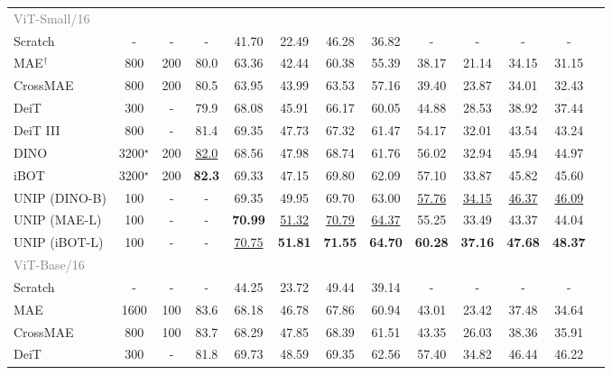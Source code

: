 \begin{table}[t]
{{\begin{tabular}{l c c c c  c c c c c c c c}
         \midrule
         \textcolor{gray}{ViT-Small/16} & & & & & & & & & & & \\
         Scratch & - & - & - & 41.70 & 22.49 & 46.28 & 36.82 & - & - & - & - \\
         \rowcolor{gray!15} MAE$^\dag$ \citep{mae} & 800 & 200 & 80.0 & 63.36 & 42.44 & 60.38 & 55.39 & 38.17 & 21.14 & 34.15 & 31.15 \\
         \rowcolor{gray!15} CrossMAE \citep{crossmae} & 800 & 200 & 80.5 & 63.95 & 43.99 & 63.53 & 57.16 & 39.40 & 23.87 & 34.01 & 32.43 \\
         \rowcolor{orange!15} DeiT \citep{deit} & 300 & - & 79.9 & 68.08 & 45.91 & 66.17 & 60.05 & 44.88 & 28.53 & 38.92 & 37.44 \\
         \rowcolor{orange!15} DeiT III \citep{deit3} & 800 & - & 81.4 & 69.35 & 47.73 & 67.32 & 61.47 & 54.17 & 32.01 & 43.54 & 43.24 \\
         \rowcolor{orange!15} DINO \citep{dino} & 3200$^\star$ & 200 & \underline{82.0} & 68.56 & 47.98 & 68.74 & 61.76 & 56.02 & 32.94 & 45.94 & 44.97 \\
         \rowcolor{orange!15} iBOT \citep{iBOT} & 3200$^\star$ & 200 & \textbf{82.3} & 69.33 & 47.15 & 69.80 & 62.09 & 57.10 & 33.87 & 45.82 & 45.60 \\
         \rowcolor{cyan!15} UNIP (DINO-B) & 100 & - & - & 69.35 & 49.95 & 69.70 & 63.00 & \underline{57.76} & \underline{34.15} & \underline{46.37} & \underline{46.09} \\
         \rowcolor{cyan!15} UNIP (MAE-L) & 100 & - & - & \textbf{70.99} & \underline{51.32} & \underline{70.79} & \underline{64.37} & 55.25 & 33.49 & 43.37 & 44.04 \\
         \rowcolor{cyan!15} UNIP (iBOT-L) & 100 & - & - & \underline{70.75} & \textbf{51.81} & \textbf{71.55} & \textbf{64.70} & \textbf{60.28} & \textbf{37.16} & \textbf{47.68} & \textbf{48.37} \\ 
        \midrule
        \textcolor{gray}{ViT-Base/16} & & & & & & & & & & & \\
        Scratch & - & - & - & 44.25 & 23.72 & 49.44 & 39.14 & - & - & - & - \\
        \rowcolor{gray!15} MAE \citep{mae} & 1600 & 100 & 83.6 & 68.18 & 46.78 & 67.86 & 60.94 & 43.01 & 23.42 & 37.48 & 34.64 \\
        \rowcolor{gray!15} CrossMAE \citep{crossmae} & 800 & 100 & 83.7 & 68.29 & 47.85 & 68.39 & 61.51 & 43.35 & 26.03 & 38.36 & 35.91 \\
        \rowcolor{orange!15} DeiT \citep{deit} & 300 & - & 81.8 & 69.73 & 48.59 & 69.35 & 62.56 & 57.40 & 34.82 & 46.44 & 46.22 \\

\end{tabular}}}
\end{table}
